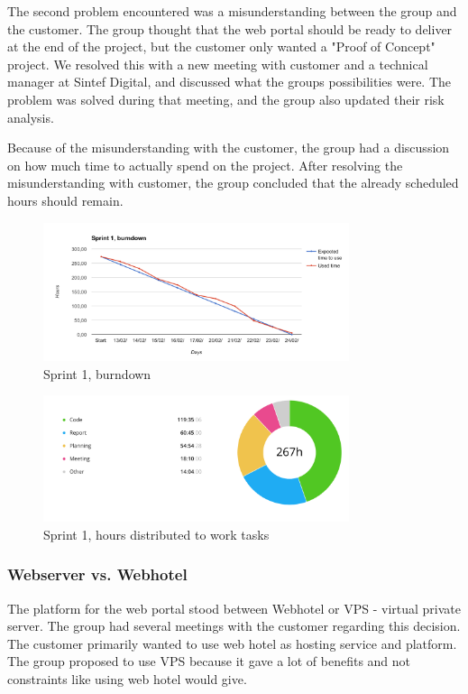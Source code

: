 The second problem encountered was a misunderstanding between the group and the customer. The group thought that the web portal should be ready to deliver at the end of the project, but the customer only wanted a "Proof of Concept" project. We resolved this with a new meeting with customer and a technical manager at Sintef Digital, and discussed what the groups possibilities were. The problem was solved during that meeting, and the group also updated their risk analysis.

Because of the misunderstanding with the customer, the group had a discussion on how much time to actually spend on the project. After resolving the misunderstanding with customer, the group concluded that the already scheduled hours should remain.


\begin{figure}[h!]
\centering
    \includegraphics[width=0.8\textwidth]{fig/sprint1}
\caption{Sprint 1, burndown}
\end{figure}

\begin{figure}[h!]
\centering
    \includegraphics[width=0.8\textwidth]{fig/sprint1-diagram}
\caption{Sprint 1, hours distributed to work tasks}
\end{figure}


\subsubsection{Webserver vs. Webhotel}
The platform for the web portal stood between Webhotel or VPS - virtual private server.  The group had several meetings with the customer regarding this decision. The customer primarily wanted to use web hotel as hosting service and platform. The group proposed to use VPS because it gave a lot of benefits and not constraints like using web hotel would give. 

